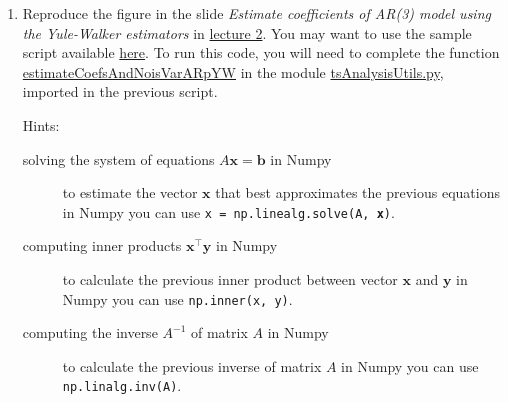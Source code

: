 \documentclass[12pt]{article}
\begin{document}
\begin{enumerate}
    \item Reproduce the figure in the slide \emph{Estimate coefficients of
        AR(3) model using the Yule-Walker estimators} in
        \href{https://github.com/joacorapela/statNeuro2025/blob/master/lectures/02_temporalTimeSeriesAnalysis/temporalTimeSeriesAnalysis.pdf}{lecture 2}. You may want to use the
        sample script available
        \href{https://github.com/joacorapela/statNeuro2025/blob/master/worksheets/02_temporalTimeSeriesAnalysis/plot_estimateCoefsAR3YW.py}{here}.
        To run this code, you will need to complete the function
        \href{https://github.com/joacorapela/statNeuro2025/blob/5c570ed3bbb4311d80c280fcb30c4a1ec26f5b53/worksheets/02_temporalTimeSeriesAnalysis/tsAnalysisUtils.py\#L28}{estimateCoefsAndNoisVarARpYW} in
        the module
        \href{https://github.com/joacorapela/statNeuro2025/blob/master/worksheets/02_temporalTimeSeriesAnalysis/tsAnalysisUtils.py\#L28}{tsAnalysisUtils.py},
        imported in the previous script.

        Hints:

        \begin{description}

            \item[solving the system of equations $A\mathbf{x}=\mathbf{b}$ in
                Numpy] to estimate the vector $\mathbf{x}$ that best
                approximates the previous equations in Numpy you can use
                \texttt{x = np.linealg.solve(A, \textbf{x})}.

            \item[computing inner products $\mathbf{x}^\intercal\mathbf{y}$ in
                Numpy] to calculate the previous inner product between vector
                $\mathbf{x}$ and $\mathbf{y}$ in Numpy you can use
                \texttt{np.inner(x, y)}.

            \item[computing the inverse $A^{-1}$ of matrix $A$ in Numpy] to
                calculate the previous inverse of matrix $A$ in Numpy you can
                use \texttt{np.linalg.inv(A)}.

        \end{description}

\end{enumerate}
\end{document}
